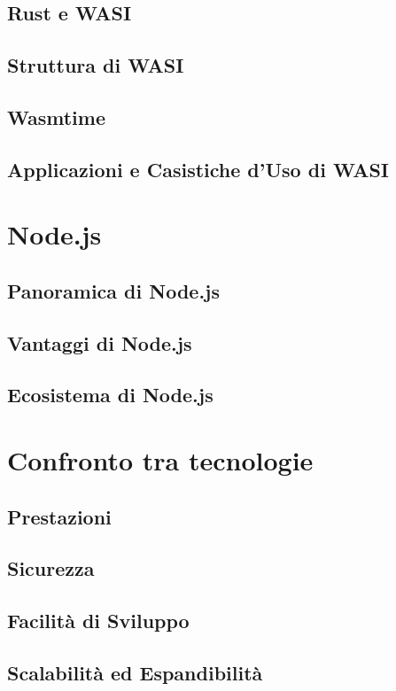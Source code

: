 \subsection{Rust e WASI}
\subsection{Struttura di WASI}
\subsection{Wasmtime}
\subsection{Applicazioni e Casistiche d'Uso di WASI}

\newpage
\section{Node.js}
\label{sec:Node}
\subsection{Panoramica di Node.js}
\subsection{Vantaggi di Node.js}
\subsection{Ecosistema di Node.js}

\newpage
\section{Confronto tra tecnologie}
\label{sec:Confronto}
\subsection{Prestazioni}
\subsection{Sicurezza}
\subsection{Facilità di Sviluppo}
\subsection{Scalabilità ed Espandibilità}

